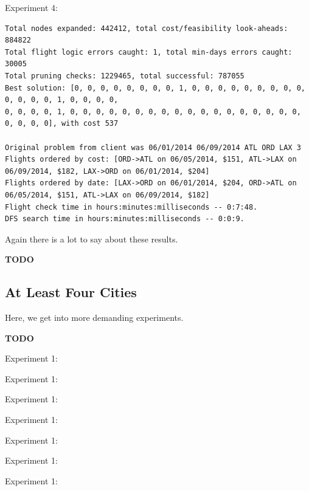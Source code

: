 \documentclass{article}
\begin{document}
Experiment 4:

\scriptsize
\begin{verbatim}
Total nodes expanded: 442412, total cost/feasibility look-aheads: 884822
Total flight logic errors caught: 1, total min-days errors caught: 30005
Total pruning checks: 1229465, total successful: 787055
Best solution: [0, 0, 0, 0, 0, 0, 0, 0, 1, 0, 0, 0, 0, 0, 0, 0, 0, 0, 0, 0, 0, 0, 1, 0, 0, 0, 0,
0, 0, 0, 0, 1, 0, 0, 0, 0, 0, 0, 0, 0, 0, 0, 0, 0, 0, 0, 0, 0, 0, 0, 0, 0, 0, 0], with cost 537

Original problem from client was 06/01/2014 06/09/2014 ATL ORD LAX 3
Flights ordered by cost: [ORD->ATL on 06/05/2014, $151, ATL->LAX on 06/09/2014, $182, LAX->ORD on 06/01/2014, $204]
Flights ordered by date: [LAX->ORD on 06/01/2014, $204, ORD->ATL on 06/05/2014, $151, ATL->LAX on 06/09/2014, $182]
Flight check time in hours:minutes:milliseconds -- 0:7:48.
DFS search time in hours:minutes:milliseconds -- 0:0:9.
\end{verbatim}
\normalsize

Again there is a lot to say about these results.

{\bf TODO}

\subsection{At Least Four Cities}\label{app:many-cities}

Here, we get into more demanding experiments.

{\bf TODO}

Experiment 1:


Experiment 1:


Experiment 1:


Experiment 1:


Experiment 1:


Experiment 1:


Experiment 1:
\end{document}

